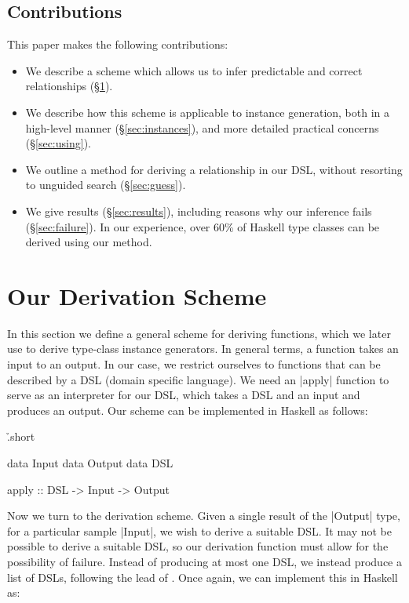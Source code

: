 \documentclass{llncs}
\newcommand\citet\cite
\begin{document}
\subsection{Contributions}

This paper makes the following contributions:

\begin{itemize}
\item We describe a scheme which allows us to infer predictable and correct relationships (\S\ref{sec:scheme}).
\item We describe how this scheme is applicable to instance generation, both in a high-level manner (\S\ref{sec:instances}), and more detailed practical concerns (\S\ref{sec:using}).
\item We outline a method for deriving a relationship in our DSL, without resorting to unguided search (\S\ref{sec:guess}).
\item We give results (\S\ref{sec:results}), including reasons why our inference fails (\S\ref{sec:failure}). In our experience, over 60\% of Haskell type classes can be derived using our method.
\end{itemize}

\section{Our Derivation Scheme}
\label{sec:scheme}

In this section we define a general scheme for deriving functions, which we later use to derive type-class instance generators. In general terms, a function takes an input to an output. In our case, we restrict ourselves to functions that can be described by a DSL (domain specific language). We need an |apply| function to serve as an interpreter for our DSL, which takes a DSL and an input and produces an output. Our scheme can be implemented in Haskell as follows:

\h{.short}\begin{code}
data Input
data Output
data DSL

apply :: DSL -> Input -> Output
\end{code}

Now we turn to the derivation scheme. Given a single result of the |Output| type, for a particular sample |Input|, we wish to derive a suitable DSL. It may not be possible to derive a suitable DSL, so our derivation function must allow for the possibility of failure. Instead of producing at most one DSL, we instead produce a list of DSLs, following the lead of \citet{wadler:list_of_successes}. Once again, we can implement this in Haskell as:
\end{document}
